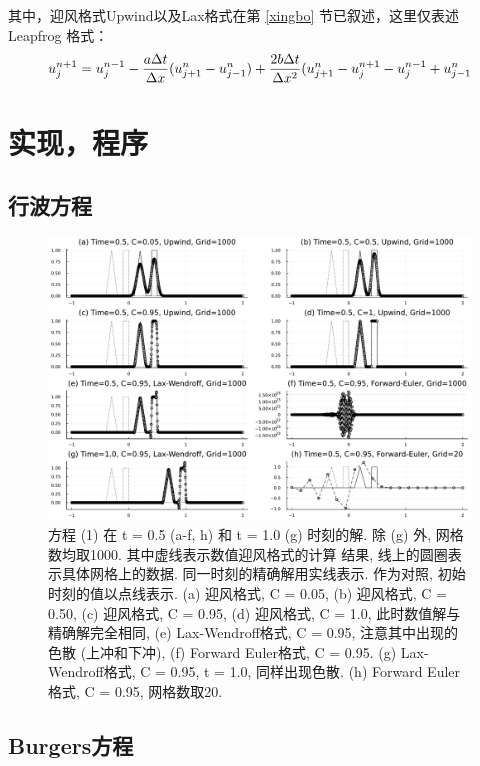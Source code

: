 \documentclass{article}
\begin{document}
其中，迎风格式Upwind以及Lax格式在第 \ref{xingbo} 节已叙述，这里仅表述 Leapfrog 格式：
\begin{equation}
    u^{n+1}_j = u^{n-1}_j - {a \Delta t\over \Delta x}(u^n_{j+1}-u^n_{j-1})+{2b\Delta t\over \Delta x^2}(u^n_{j+1}-u^{n+1}_j-u^{n-1}_j+u^n_{j-1}
\end{equation}

\section{实现，程序}
\subsection{行波方程}
\begin{figure}[H]
    \centering
    \includegraphics[width=1.0\textwidth]{hw2.pdf}
    \caption{方程 (1) 在 t = 0.5 (a-f, h) 和 t = 1.0 (g) 时刻的解. 除 (g) 外, 网格数均取1000. 其中虚线表示数值迎风格式的计算 结果, 线上的圆圈表示具体网格上的数据. 同一时刻的精确解用实线表示. 作为对照, 初始时刻的值以点线表示. (a) 迎风格式, C = 0.05, (b) 迎风格式, C = 0.50, (c) 迎风格式, C = 0.95, (d) 迎风格式, C = 1.0, 此时数值解与精确解完全相同, (e) Lax-Wendroﬀ格式, C = 0.95, 注意其中出现的色散 (上冲和下冲), (f) Forward Euler格式, C = 0.95. (g) Lax-Wendroff格式, C = 0.95, t = 1.0, 同样出现色散. (h) Forward Euler格式, C = 0.95, 网格数取20. }
    \label{fig:1}
\end{figure}

\subsection{Burgers方程}
\end{document}
